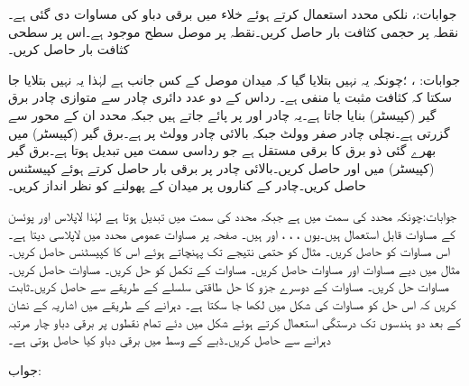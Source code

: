 جوابات:،  
نلکی محدد استعمال کرتے ہوئے خلاء میں برقی دباو کی مساوات  دی گئی ہے۔ نقطہ  پر حجمی کثافت بار  حاصل کریں۔نقطہ  پر موصل سطح موجود ہے۔اس پر سطحی کثافت بار  حاصل کریں۔

جوابات: ، ؛چونکہ یہ نہیں بتلایا گیا کہ میدان موصل کے کس جانب ہے لہٰذا یہ نہیں بتلایا جا سکتا کہ کثافت مثبت یا منفی ہے۔
رداس  کے دو عدد دائری چادر سے متوازی چادر برق گیر (کپیسٹر)  بنایا جاتا ہے۔یہ چادر  اور  پر پائے جاتے ہیں جبکہ  محدد ان کے محور سے گزرتی ہے۔نچلی چادر صفر وولٹ جبکہ بالائی چادر  وولٹ پر ہے۔برق گیر (کپیسٹر)  میں بھرے گئی ذو برق کا برقی مستقل  ہے جو رداسی سمت میں تبدیل ہوتا ہے۔برق گیر (کپیسٹر)  میں  اور  حاصل کریں۔بالائی چادر پر برقی بار حاصل کرتے ہوئے کپیسٹنس حاصل کریں۔چادر کے کناروں پر میدان کے پھولنے کو نظر انداز کریں۔

جوابات:چونکہ   محدد  کی سمت میں ہے جبکہ  محدد  کی سمت میں تبدیل ہوتا ہے لہٰذا لاپلاس اور پوئسن کے مساوات قابل استعمال ہیں۔یوں ،  ، ،  اور  ہیں۔
صفحہ  پر مساوات  عمومی محدد میں لاپلاسی دیتا ہے۔اس مساوات کو حاصل کریں۔
مثال  کو حتمی نتیجے تک پہنچاتے ہوئے اس  کا کپیسٹنس حاصل کریں۔
مثال  میں دیے مساوات  اور مساوات  حاصل کریں۔
مساوات  کے تکمل کو حل کریں۔
مساوات  حاصل کریں۔
مساوات  حل کریں۔
مساوات  کے دوسرے جزو کا حل طاقتی سلسلے کے طریقے سے حاصل کریں۔ثابت کریں کہ اس حل کو مساوات  کی شکل میں لکھا جا سکتا ہے۔
دہرانے کے طریقے میں اشاریہ کے نشان کے بعد دو ہندسوں تک درستگی استعمال کرتے ہوئے شکل  میں دئے تمام نقطوں پر برقی دباو چار مرتبہ دہرانے سے حاصل کریں۔ڈبے کے وسط میں برقی دباو کیا حاصل ہوتی ہے۔

جواب: 
